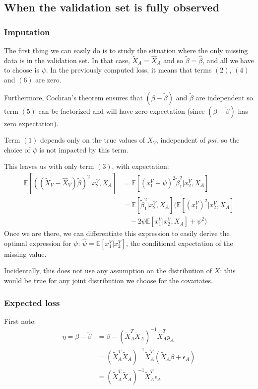 \documentclass[12pt, a4paper]{memoir}
\begin{document}
		\subsection{When the validation set is fully observed}
			\subsubsection{Imputation}
The first thing we can easily do is to study the situation where the only missing data is in the validation set. In that case, $\tilde{X}_A = \hat{X}_A$ and so $\tilde{\beta} = \hat{\beta}$, and all we have to choose is $\psi$. In the previously computed loss, it means that terms $(2)$, $(4)$ and $(6)$ are zero.

Furthermore, Cochran's theorem ensures that $(\beta - \tilde{\beta})$ and $\tilde{\beta}$ are independent so term $(5)$ can be factorized and will have zero expectation (since $(\beta - \tilde{\beta})$ has zero expectation).

Term $(1)$ depends only on the true values of $X_V$, independent of $psi$, so the choice of $\psi$  is not impacted by this term.

This leaves us with only term $(3)$, with expectation:
\begin{align*}
\mathbb{E}[((\tilde{X}_V-\hat{X}_V)\tilde{\beta})^2 \vert x^V_2, X_A] &= \mathbb{E}[(x_1^V - \psi)^2 \tilde{\beta}_1^2 \vert x^V_2, X_A] \\
													&= \mathbb{E}[\tilde{\beta}_1^2 \vert x^V_2, X_A] (\mathbb{E}[(x_1^V)^2\vert x^V_2, X_A] \\
													& \quad - 2\psi \mathbb{E}[x_1^V\vert x^V_2, X_A] + \psi^2)
\end{align*}
Once we are there, we can differentiate this expression to easily derive the optimal expression for $\psi$: $\hat{\psi} = \mathbb{E}[x_1^V\vert x^V_2]$, the conditional expectation of the missing value.

Incidentally, this does not use any assumption on the distribution of $X$: this would be true for any joint distribution we choose for the covariates.

			\subsubsection{Expected loss}
First note:
\begin{align*}
\eta = \beta - \tilde{\beta} &= \beta - (\tilde{X}_A^T \tilde{X}_A)^{-1} \tilde{X}_A^T y_A \\
		&= (\tilde{X}_A^T \tilde{X}_A)^{-1} \tilde{X}_A^T (\tilde{X}_A \beta + \epsilon_A) \\
		&= (\tilde{X}_A^T \tilde{X}_A)^{-1} \tilde{X}_A^T \epsilon_A
\end{align*}
\end{document}
